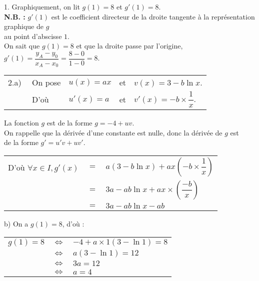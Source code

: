 \vspace*{.3cm}

1. Graphiquement, on lit $g\left(1\right) = 8$ et $g'\left(1\right) = 8$. \\

\textbf{N.B. : } $g'(1)$ est le coefficient directeur de la droite tangente à la représentation graphique de $g$ \\ au point d'abscisse $1$. \\

On sait que $g(1) = 8$ et que la droite passe par l'origine, $g'(1) = \dfrac{y_A - y_0}{x_A - x_0} = \dfrac{8 - 0}{1 - 0} = 8$. \\

\begin{tabular}{lllll}
2.a) & $\! \! \! \! \! \! \! \! \! \! $ On pose & $u(x) = ax$ & et &  $v(x) = 3 - b\ln x$. \\
& $\! \! \! \! \! \! \! \! \! \! $ D'où & $u'(x) = a$ & et & $v'(x) = -b\times \dfrac{1}{x}$. \\
\end{tabular}

\vspace*{.3cm}

La fonction $g$ est de la forme $g = -4 + uv$. \\
On rappelle que la dérivée d'une constante est nulle, donc la dérivée de $g$ est \\ de la forme $g' = u'v + uv'$. \\

\begin{tabular}{lll}
D'où $\forall x \in I, g'(x)$ & $=$ & $a\left(3 - b\ln x\right) + ax \left(-b\times \dfrac{1}{x}\right)$ \vspace*{.3cm} \\
& $=$ & $3a - ab\ln x + ax \times \left(\dfrac{-b}{x}\right)$ \vspace*{.3cm} \\
& $=$ & $3a - ab\ln x - ab$ \\
\end{tabular}

\vspace*{.3cm}

b) On a $g(1) = 8$, d'où : \\

\begin{tabular}{lll}
$g(1) = 8$ & $\Longleftrightarrow$ & $-4 + a\times 1\left(3-\ln 1\right) = 8$ \\
& $\Longleftrightarrow$ & $a\left(3 - \ln 1\right) = 12$ \\
& $\Longleftrightarrow$ & $3a = 12$ \\
& $\Longleftrightarrow$ & $a = 4$ \\
\end{tabular}

